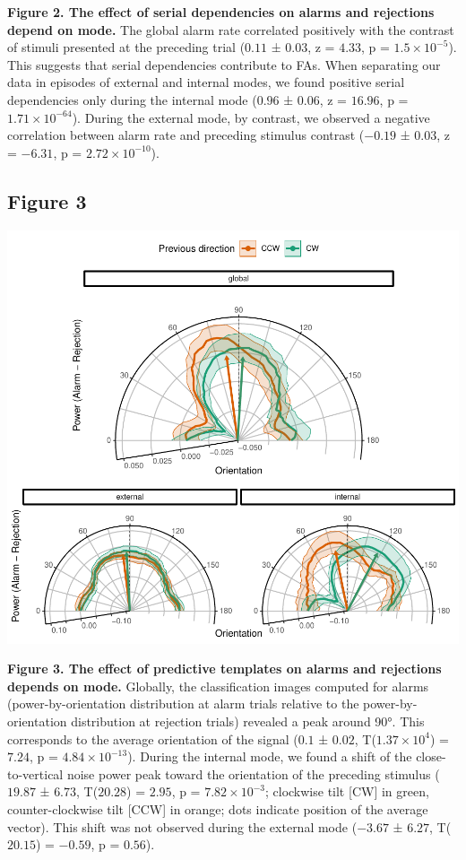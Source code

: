 \documentclass[
]{article}
\begin{document}
\textbf{Figure 2. The effect of serial dependencies on alarms and
rejections depend on mode.} The global alarm rate correlated positively
with the contrast of stimuli presented at the preceding trial (\(0.11\)
± \(0.03\), z = \(4.33\), p = \(\ensuremath{1.5\times 10^{-5}}\)). This
suggests that serial dependencies contribute to FAs. When separating our
data in episodes of external and internal modes, we found positive
serial dependencies only during the internal mode (\(0.96\) ± \(0.06\),
z = \(16.96\), p = \(\ensuremath{1.71\times 10^{-64}}\)). During the
external mode, by contrast, we observed a negative correlation between
alarm rate and preceding stimulus contrast (\(-0.19\) ± \(0.03\), z =
\(-6.31\), p = \(\ensuremath{2.72\times 10^{-10}}\)).

\newpage

\hypertarget{figure-3}{%
\subsection{Figure 3}\label{figure-3}}

\includegraphics{predictive_templates_files/figure-latex/rev_Figure_3-1.pdf}

\textbf{Figure 3. The effect of predictive templates on alarms and
rejections depends on mode.} Globally, the classification images
computed for alarms (power-by-orientation distribution at alarm trials
relative to the power-by-orientation distribution at rejection trials)
revealed a peak around 90°. This corresponds to the average orientation
of the signal (\(0.1\) ± \(0.02\), T(\(\ensuremath{1.37\times 10^{4}}\))
= \(7.24\), p = \(\ensuremath{4.84\times 10^{-13}}\)). During the
internal mode, we found a shift of the close-to-vertical noise power
peak toward the orientation of the preceding stimulus (\(19.87\) ±
\(6.73\), T(\(20.28\)) = \(2.95\), p =
\(\ensuremath{7.82\times 10^{-3}}\); clockwise tilt {[}CW{]} in green,
counter-clockwise tilt {[}CCW{]} in orange; dots indicate position of
the average vector). This shift was not observed during the external
mode (\(-3.67\) ± \(6.27\), T(\(20.15\)) = \(-0.59\), p = \(0.56\)).
\end{document}

